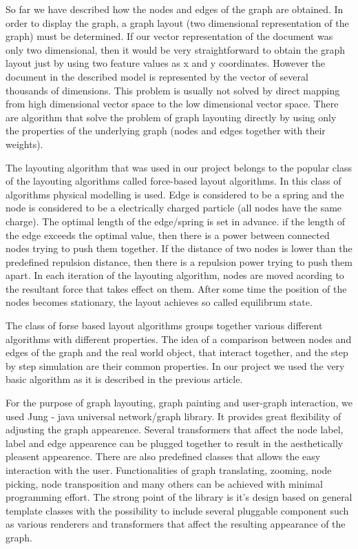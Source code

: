 
So far we have described how the nodes and edges of the graph are obtained. In order to display the graph, a graph layout (two dimensional representation of the graph) must be determined. If our vector representation of the document was only two dimensional, then it would be very straightforward to obtain the graph layout just by using two feature values as x and y coordinates. However the document in the described model is represented by the vector of several thousands of dimensions. This problem is usually not solved by direct mapping from high dimensional vector space to the low dimensional vector space. There are algorithm that solve the problem of graph layouting directly by using only the properties of the underlying graph (nodes and edges together with their weights).

The layouting algorithm that was used in our project belongs to the popular class of the layouting algorithms called force-based layout algorithms. In this class of algorithms physical modelling is used. Edge is considered to be a spring and the node is considered to be a electrically charged particle (all nodes have the same charge). The optimal length of the edge/spring is set in advance. if the length of the edge exceeds the optimal value, then there is a power between connected nodes trying to push them together. If the distance of two nodes is lower than the predefined repulsion distance, then there is a repulsion power trying to push them apart. In each iteration of the layouting algorithm, nodes are moved acording to the resultant force that takes effect on them. After some time the position of the nodes becomes stationary, the layout achieves so called equilibrum state.

The class of forse based layout algorithms groups together various different algorithms with different properties. The idea of a comparison between nodes and edges of the graph and the real world object, that interact together, and the step by step simulation are their common properties. In our project we used the very basic algorithm as it is described in the previous article.

For the purpose of graph layouting, graph painting and user-graph interaction, we used Jung - java universal network/graph library. It provides great flexibility of adjusting the graph appearence. Several transformers that affect the node label, label and edge appearence can be plugged together to result in the aesthetically pleasent appearence. There are also predefined classes that allows the easy interaction with the user. Functionalities of graph translating, zooming, node picking, node transposition and many others can be achieved with minimal programming effort. The strong point of the library is it's design based on general template classes with the possibility to include several pluggable component such as various renderers and transformers that affect the resulting appearance of the graph. 

